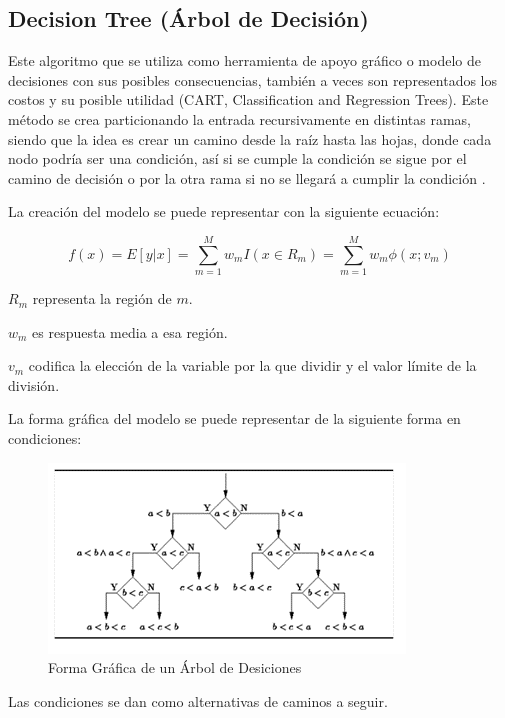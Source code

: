 \doublespacing
\subsection{Decision Tree (Árbol de Decisión)}
Este algoritmo que se utiliza como herramienta de apoyo gráfico o modelo de decisiones con sus posibles consecuencias, también a veces son representados los costos y su posible utilidad (CART, Classification and Regression Trees). Este método se crea particionando la entrada recursivamente en distintas ramas, siendo que la idea es crear un camino desde la raíz hasta las hojas, donde cada nodo podría ser una condición, así si se cumple la condición se sigue por el camino de decisión o por la otra rama si no se llegará a cumplir la condición \cite{Teknomo2015}.\\
\par La creación del modelo se puede representar con la siguiente ecuación:\\

\begin{Large}
	\begin{equation}
		f(x)=E[y|x]=\sum_{m=1}^{M}w_{m}I(x \in R_{m})=\sum_{m=1}^{M}w_{m}\phi(x;v_{m})
	\end{equation}
\end{Large}
\par $R_{m}$ representa la región de $m$.
\par $w_{m}$ es respuesta media a esa región.
\par $v_{m}$ codifica la elección de la variable por la que dividir y el valor límite de la división.\\
\par  La forma gráfica del modelo se puede representar de la siguiente forma en condiciones:\\

\begin{figure}[h]
	\centering
	\includegraphics[scale=1]{img/Marco Teorico/arbol de desicion.png} 
	\caption{Forma Gráfica de un Árbol de Desiciones}
\end{figure}
\par Las condiciones se dan como alternativas de caminos a seguir.\\

